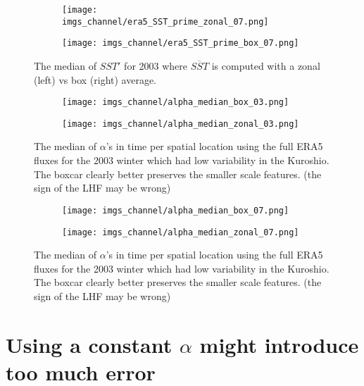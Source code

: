 \documentclass[12pt,a4paper]{article}
\begin{document}
\begin{figure}[h!]
\centering
\begin{subfigure}[t]{0.49\textwidth}
\texttt{[image: imgs\_channel/era5\_SST\_prime\_zonal\_07.png]}
\end{subfigure}
\begin{subfigure}[t]{0.49\textwidth}
\texttt{[image: imgs\_channel/era5\_SST\_prime\_box\_07.png]}
\end{subfigure}
\caption{The median of $SST'$ for 2003 where $\overline{SST}$ is computed with a zonal (left) vs box (right) average.}
\end{figure}



\begin{figure}[h!]
\centering
\begin{subfigure}[t]{\textwidth}
\texttt{[image: imgs\_channel/alpha\_median\_box\_03.png]}
\end{subfigure}
\begin{subfigure}[t]{\textwidth}
\texttt{[image: imgs\_channel/alpha\_median\_zonal\_03.png]}
\end{subfigure}
\caption{The median of $\alpha$'s in time per spatial location using the full ERA5 fluxes for the 2003 winter which had low variability in the Kuroshio. The boxcar clearly better preserves the smaller scale features. (the sign of the LHF may be wrong)
}
\end{figure}

\begin{figure}[h!]
\centering
\begin{subfigure}[t]{\textwidth}
\texttt{[image: imgs\_channel/alpha\_median\_box\_07.png]}
\end{subfigure}
\begin{subfigure}[t]{\textwidth}
\texttt{[image: imgs\_channel/alpha\_median\_zonal\_07.png]}
\end{subfigure}
\caption{The median of $\alpha$'s in time per spatial location using the full ERA5 fluxes for the 2003 winter which had low variability in the Kuroshio. The boxcar clearly better preserves the smaller scale features. (the sign of the LHF may be wrong)}
\end{figure}

\section{Using a constant $\alpha$ might introduce too much error}
\end{document}
